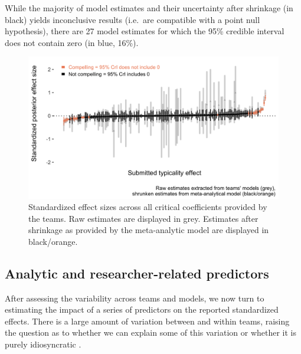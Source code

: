 \documentclass[Review,times,sageh]{sagej}
\begin{document}
While the majority of model estimates and their uncertainty after shrinkage (in black) yields inconclusive results (i.e.~are compatible with a point null hypothesis), there are 27 model estimates for which the 95\% credible interval does not contain zero (in blue, 16\%).



\begin{figure}
\includegraphics[width=1\linewidth]{../figs/meta_plot1_shrinkage} \caption{Standardized effect sizes across all critical coefficients provided by the teams. Raw estimates are displayed in grey. Estimates after shrinkage as provided by the meta-analytic model are displayed in black/orange.}\label{fig:plot-meta1}
\end{figure}

\hypertarget{analytic-and-researcher-related-predictors}{%
\subsection{Analytic and researcher-related predictors}\label{analytic-and-researcher-related-predictors}}

After assessing the variability across teams and models, we now turn to estimating the impact of a series of predictors on the reported standardized effects.
There is a large amount of variation between and within teams, raising the question as to whether we can explain some of this variation or whether it is purely idiosyncratic \citep{breznau2021observing}.
\end{document}
